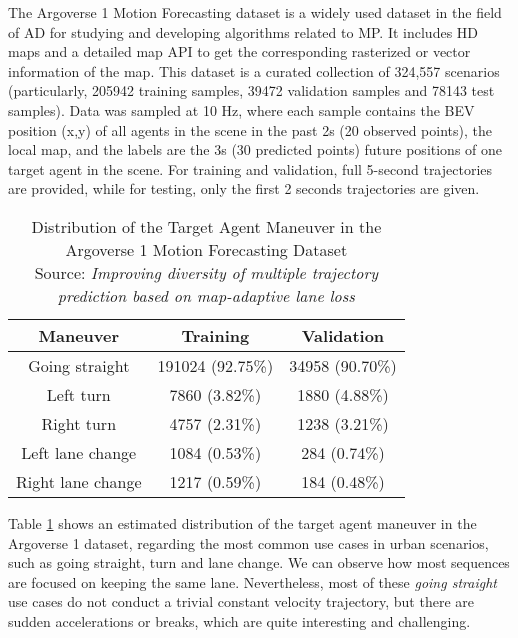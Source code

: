The Argoverse 1 Motion Forecasting dataset is a widely used dataset in the field of \ac{AD} for studying and developing algorithms related to \ac{MP}. It includes HD maps and a detailed map API to get the corresponding rasterized or vector information of the map. This dataset is a curated collection of 324,557 scenarios (particularly, 205942 training samples, 39472 validation samples and 78143 test samples). Data was sampled at 10 Hz, where each sample contains the \ac{BEV} position (x,y) of all agents in the scene in the past 2s (20 observed points), the local map, and the labels are the 3s (30 predicted points) future positions of one target agent in the scene. For training and validation, full 5-second trajectories are provided, while for testing, only the first 2 seconds trajectories are given. 

\begin{table}[!tpbh]
	\centering
	\caption[Distribution of the Target Agent Maneuver in the Argoverse 1 Motion Forecasting Dataset]{Distribution of the Target Agent Maneuver in the Argoverse 1 Motion Forecasting Dataset \\
	Source: \textit{Improving diversity of multiple trajectory prediction based on map-adaptive lane loss} \cite{kim2022improving}}
	\label{table:2_argoverse1_maneuvers_distribution}
	\begin{tabular}{c|c|c}
		\toprule
		Maneuver & Training  & Validation\\
		\midrule
		Going straight & 191024 (92.75\%) & 34958 (90.70\%) \\
		Left turn & 7860 (3.82\%) & 1880 (4.88\%) \\
		Right turn & 4757 (2.31\%) & 1238 (3.21\%) \\
		Left lane change & 1084 (0.53\%) & 284 (0.74\%) \\
		Right lane change & 1217 (0.59\%) & 184 (0.48\%) \\
		\bottomrule
	\end{tabular}
\end{table} 

Table \ref{table:2_argoverse1_maneuvers_distribution} shows an estimated distribution of the target agent maneuver in the Argoverse 1 dataset, regarding the most common use cases in urban scenarios, such as going straight, turn and lane change. We can observe how most sequences are focused on keeping the same lane. Nevertheless, most of these \textit{going straight} use cases do not conduct a trivial constant velocity trajectory, but there are sudden accelerations or breaks, which are quite interesting and challenging.

